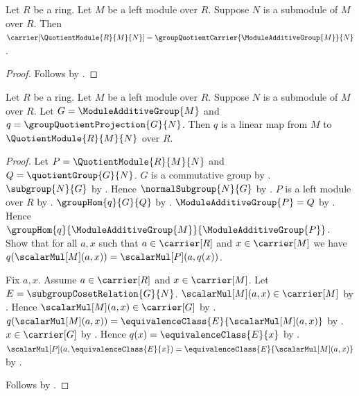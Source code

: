 \begin{proposition}\label{quotient_module_carrier}
    Let $R$ be a ring.
    Let $M$ be a left module over $R$.
    Suppose $N$ is a submodule of $M$ over $R$.
    Then
        $\carrier[\QuotientModule{R}{M}{N}]
            =\groupQuotientCarrier{\ModuleAdditiveGroup{M}}{N}$.
\end{proposition}
\begin{proof}
    Follows by
        .
\end{proof}

\begin{theorem}\label{quotient_module_projection_linear}
    Let $R$ be a ring.
    Let $M$ be a left module over $R$.
    Suppose $N$ is a submodule of $M$ over $R$.
    Let $G=\ModuleAdditiveGroup{M}$ and
        $q=\groupQuotientProjection{G}{N}$.
    Then $q$ is a linear map from $M$ to
        $\QuotientModule{R}{M}{N}$ over $R$.
\end{theorem}
\begin{proof}
    Let $P=\QuotientModule{R}{M}{N}$ and
        $Q=\quotientGroup{G}{N}$.
    $G$ is a commutative group by
        .
    $\subgroup{N}{G}$ by .
    Hence $\normalSubgroup{N}{G}$ by
        .
    $P$ is a left module over $R$ by
        .
    $\groupHom{q}{G}{Q}$ by
        .
    $\ModuleAdditiveGroup{P}=Q$ by
        .
    Hence $\groupHom{q}{\ModuleAdditiveGroup{M}}{
        \ModuleAdditiveGroup{P}}$.
    Show that for all $a,x$ such that $a\in\carrier[R]$ and
        $x\in\carrier[M]$ we have
        $q(\scalarMul[M](a,x))=\scalarMul[P](a,q(x))$.
    \begin{subproof}
        Fix $a,x$.
        Assume $a\in\carrier[R]$ and $x\in\carrier[M]$.
        Let $E=\subgroupCosetRelation{G}{N}$.
        $\scalarMul[M](a,x)\in\carrier[M]$ by
            .
        Hence $\scalarMul[M](a,x)\in\carrier[G]$ by
            .
        $q(\scalarMul[M](a,x))=
            \equivalenceClass{E}{\scalarMul[M](a,x)}$ by
            .
        $x\in\carrier[G]$ by
            .
        Hence $q(x)=\equivalenceClass{E}{x}$ by
            .
        $\scalarMul[P](a,\equivalenceClass{E}{x})
            =\equivalenceClass{E}{\scalarMul[M](a,x)}$ by
            .
    \end{subproof}
    Follows by .
\end{proof}

